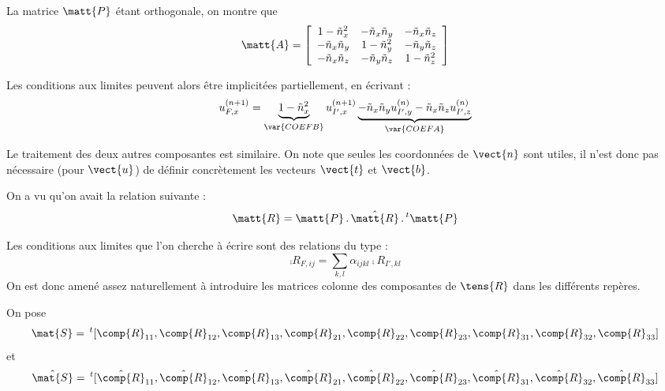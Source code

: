 La matrice $\matt{P}$ \'etant orthogonale, on montre que
\begin{equation}
\matt{A}=\left[
\begin{array}{ccc}
1-\tilde{n}_x^2 & -\tilde{n}_x\tilde{n}_y & -\tilde{n}_x\tilde{n}_z\\
-\tilde{n}_x\tilde{n}_y & 1-\tilde{n}_y^2 & -\tilde{n}_y\tilde{n}_z\\
-\tilde{n}_x\tilde{n}_z & -\tilde{n}_y\tilde{n}_z & 1-\tilde{n}_z^2
\end{array}\right]
\end{equation}

Les conditions aux limites peuvent alors \^etre implicit\'ees partiellement, en
\'ecrivant :
\begin{equation}
\label{Base_Clsyvt_eq_clU}
u_{F,x}^{(n+1)} = \underbrace{1-\tilde{n}_x^2}_{\var{COEFB}}u_{I',x}^{(n+1)}
\underbrace{-\tilde{n}_x\tilde{n}_y u_{I',y}^{(n)}
-\tilde{n}_x\tilde{n}_z u_{I',z}^{(n)}}_{\var{COEFA}}
\end{equation}

Le traitement des deux autres composantes est similaire. On note que seules les
coordonn\'ees de $\vect{n}$ sont utiles, il n'est donc pas n\'ecessaire (pour
$\vect{u}$) de d\'efinir concr\`etement les vecteurs $\vect{t}$ et $\vect{b}$.

\vspace{1cm}
On a vu qu'on avait la relation suivante :
\begin{equation}
\label{Base_Clsyvt_eq_chgtrepR}
\matt{R}= \matt{P}\,.\,\hat{\matt{R}}\,.\,^t\matt{P}
\end{equation}

Les conditions aux limites que l'on cherche \`a \'ecrire sont des relations du
type :
\begin{equation}
\comp{R}_{F,ij}=\sum_{k,l}\alpha_{ijkl}\comp{R}_{I',kl}
\end{equation}
On est donc amen\'e assez naturellement \`a introduire les matrices colonne des
composantes de $\tens{R}$ dans les diff\'erents rep\`eres.

On pose
\begin{equation}
\mat{S}=\,^t[\comp{R}_{11},\comp{R}_{12},\comp{R}_{13},
\comp{R}_{21},\comp{R}_{22},\comp{R}_{23},
\comp{R}_{31},\comp{R}_{32},\comp{R}_{33}]
\end{equation}
et
\begin{equation}
\hat{\mat{S}}=\,^t[\hat{\comp{R}}_{11},\hat{\comp{R}}_{12},\hat{\comp{R}}_{13},
\hat{\comp{R}}_{21},\hat{\comp{R}}_{22},\hat{\comp{R}}_{23},
\hat{\comp{R}}_{31},\hat{\comp{R}}_{32},\hat{\comp{R}}_{33}]
\end{equation}


